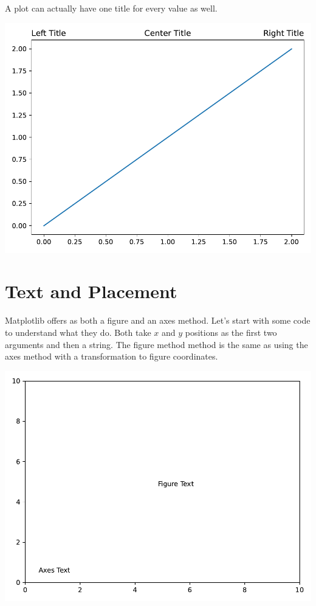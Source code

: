 A plot can actually have one title for every  value as well. 


\begin{center}
    \includegraphics[width = .7\textwidth]{figures/proseplots/title-loc.pdf}
\end{center}


\section{Text and Placement}\label{sec:textplacement}

Matplotlib offers  as both a figure and an axes method. Let's start with some code to understand what they do. Both take $x$ and $y$ positions as the first two arguments and then a string. The figure method method is the same as using the axes method with a transformation to figure coordinates. 



\begin{center}
    \includegraphics[width = .8\textwidth]{figures/proseplots/text-methods.pdf}
\end{center}

